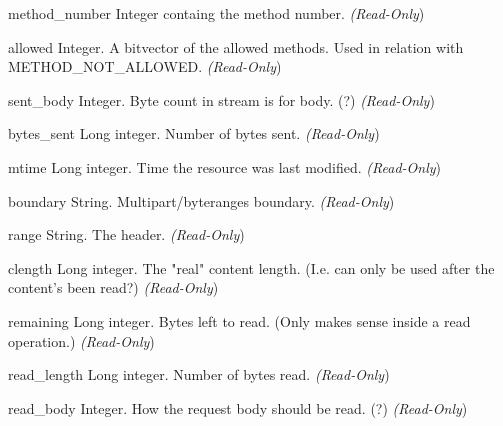 \begin{memberdesc}[request]{method_number}
Integer containg the method number.
\emph{(Read-Only})
\end{memberdesc}

\begin{memberdesc}[request]{allowed}
Integer. A bitvector of the allowed methods. Used in relation with
METHOD_NOT_ALLOWED.
\emph{(Read-Only})
\end{memberdesc}

\begin{memberdesc}[request]{sent_body}
Integer. Byte count in stream is for body. (?)
\emph{(Read-Only})
\end{memberdesc}

\begin{memberdesc}[request]{bytes_sent}
Long integer. Number of bytes sent.
\emph{(Read-Only})
\end{memberdesc}

\begin{memberdesc}[request]{mtime}
Long integer. Time the resource was last modified.
\emph{(Read-Only})
\end{memberdesc}

\begin{memberdesc}[request]{boundary}
String. Multipart/byteranges boundary.
\emph{(Read-Only})
\end{memberdesc}

\begin{memberdesc}[request]{range}
String. The  header.
\emph{(Read-Only})
\end{memberdesc}

\begin{memberdesc}[request]{clength}
Long integer. The "real" content length. (I.e. can only be used after
the content's been read?)
\emph{(Read-Only})
\end{memberdesc}

\begin{memberdesc}[request]{remaining}
Long integer. Bytes left to read. (Only makes sense inside a read
operation.)
\emph{(Read-Only})
\end{memberdesc}

\begin{memberdesc}[request]{read_length}
Long integer. Number of bytes read.
\emph{(Read-Only})
\end{memberdesc}

\begin{memberdesc}[request]{read_body}
Integer. How the request body should be read. (?)
\emph{(Read-Only})
\end{memberdesc}

